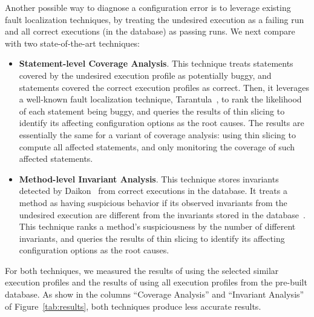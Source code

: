 

Another possible way to diagnose a configuration error is to leverage
existing fault localization techniques, by treating the undesired
execution as a failing run and all correct executions (in the database)
as passing runs. We next compare \ourtool with two state-of-the-art
techniques: %

\begin{itemize}
\item \textbf{Statement-level Coverage Analysis}. This technique treats statements covered
by the undesired execution profile as potentially buggy, and statements
covered the correct execution profiles as correct.
Then, it leverages a well-known fault localization technique,
Tarantula~\cite{Jones:2002}, to rank the likelihood of each
statement being buggy, and queries the results of thin slicing
to identify its affecting configuration options as the root causes.
The results are essentially the same for a variant of
coverage analysis: using thin slicing to compute all affected statements,
and only monitoring the coverage of such affected statements.

\item \textbf{Method-level Invariant Analysis}. This technique stores invariants detected
by Daikon~\cite{Ernst:1999} from correct executions in the database.
It treats a method as having suspicious behavior if its observed invariants
from the undesired execution are different from the invariants stored
in the database~\cite{McCamant:2003}. This technique ranks a method's suspiciousness by
the number of different invariants, and queries the results of thin slicing
to identify its affecting configuration options as the root causes. 
\end{itemize}


For both techniques, we measured the results of using the selected
similar execution profiles and the results of using
all execution profiles from the pre-built
database. As show in the columns ``Coverage Analysis'' and ``Invariant Analysis''
of Figure~\ref{tab:results}, both techniques produce less accurate results.

